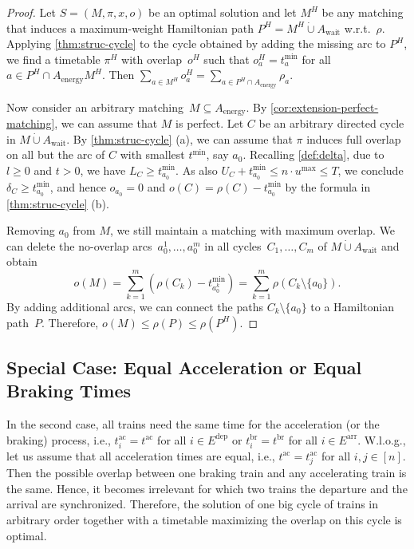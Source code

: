 \documentclass[11pt,a4paper]{article}
\newcommand{\dotcup}{\mathbin{\dot\cup}}
\newcommand{\arr}{\mathrm{arr}}
\newcommand{\dep}{\mathrm{dep}}
\newcommand{\wait}{\mathrm{wait}}
\newcommand{\energy}{\mathrm{energy}}
\newcommand{\energyact}{M}               %
\newcommand{\possenergyact}{A_{\energy}} %
\newcommand{\ac}{\mathrm{ac}}
\newcommand{\br}{\mathrm{br}}
\newcommand{\w}{\rho} %
\theoremstyle{definition}
\theoremstyle{remark}
\begin{document}
\begin{proof}
    Let $S = (\energyact, \pi, x, o)$ be an optimal solution and let $\energyact^H$ be any matching that induces a maximum-weight Hamiltonian path $P^H =\energyact^H \dotcup A_\wait$ w.r.t.\ $\w$. Applying \cref{thm:struc-cycle} to the cycle obtained by adding the missing arc to $P^H$, we find a timetable $\pi^H$ with overlap~$o^H$ such that $o^H_a = t^{\min}_a$ for all $a \in P^H \cap A_\energy \energyact^H$. Then $\sum_{a \in \energyact^H} o^H_a = \sum_{a \in P^H \cap A_\energy} \w_a$.
    
    Now consider an arbitrary matching~$\energyact \subseteq \possenergyact$.
    By \cref{cor:extension-perfect-matching}, we can assume that $\energyact$ is perfect. Let $C$ be an arbitrary directed cycle in $\energyact \dotcup A_\wait$.  By \cref{thm:struc-cycle} (a), we can assume that $\pi$ induces full overlap on all but the arc of $C$ with smallest $t^{\min}$, say $a_0$. Recalling \cref{def:delta}, due to $l \geq 0 $ and $t > 0$, we have $L_C \geq t_{a_0}^{\min}$. As also $U_C + t_{a_0}^{\min} \leq n \cdot u^{\max} \leq T$, we conclude $\delta_C \geq t_{a_0}^{\min}$, and hence $o_{a_0} = 0$ and $o(C) = \w(C) - t_{a_0}^{\min}$ by the formula in \cref{thm:struc-cycle} (b).
    
     Removing $a_0$ from $\energyact$, we still maintain a matching with maximum overlap. We can delete the no-overlap arcs~$a_0^1,\dotsc,a_0^m$ in all cycles~$C_1,\dotsc,C_m$ of $M \dotcup A_\wait$ and obtain 
     $$o(M) = \sum_{k=1}^m (\w(C_k) - t_{a_0^k}^{\min}) = \sum_{k=1}^m \w(C_k \setminus \{a_0\}).$$
     By adding additional arcs, we can connect the paths $C_k \setminus \{a_0\}$ to a Hamiltonian path~$P$. Therefore, $o(M) \le \w(P) \le \w(P^H)$.
\end{proof}


\subsection{Special Case: Equal Acceleration or Equal Braking Times}
\label{sec-SC-ac-equal-br-equal}
In the second case, all trains need the same time for the acceleration (or the braking) process, i.e., 
$t_i^{\ac} = t^{\ac}$ for all $i \in E^{\dep}$ or $t_i^{\br} = t^{\br}$ for all $i \in E^{\arr}$. W.l.o.g., let us assume that all acceleration times are equal, i.e., $t^{\ac} = t^{\ac}_j$ for all $i,j \in [n]$. Then the possible overlap between one braking train and any accelerating train is the same. Hence, it becomes irrelevant for which two trains the departure and the arrival are synchronized. Therefore, the solution of one big cycle of trains in arbitrary order together with a timetable maximizing the overlap on this cycle is optimal.
\end{document}
